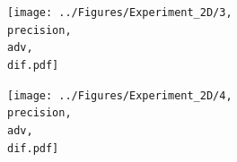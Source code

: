 \documentclass{scrartcl}
\begin{document}
	\begin{figure}[H]
		\centering
		\texttt{[image: ../Figures/Experiment\_2D/3, \\precision, \\adv, \\dif.pdf]}
	\end{figure}
	
	\begin{figure}[H]
		\centering
		\texttt{[image: ../Figures/Experiment\_2D/4, \\precision, \\adv, \\dif.pdf]}
	\end{figure}
	
	
	
	
	
\end{document}
